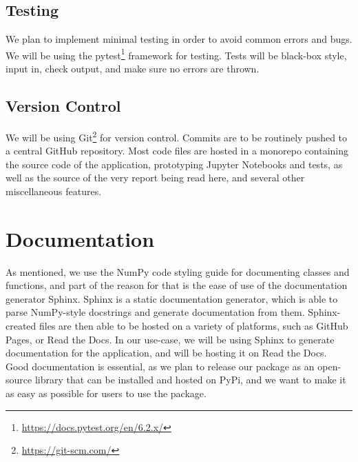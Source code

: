 \subsection{Testing}
We plan to implement minimal testing in order to avoid common errors and bugs. We will be using the pytest\footnote{\url{https://docs.pytest.org/en/6.2.x/}} framework for testing. Tests will be black-box style, input in, check output, and make sure no errors are thrown. 

\subsection{Version Control}

We will be using Git\footnote{\url{https://git-scm.com/}} for version control. Commits are to be routinely pushed to a central GitHub repository. Most code files are hosted in a monorepo containing the source code of the application, prototyping Jupyter Notebooks and tests, as well as the source of the very report being read here, and several other miscellaneous features. 


\section{Documentation}
As mentioned, we use the NumPy code styling guide for documenting classes and functions, and part of the reason for that is the ease of use of the documentation generator Sphinx. Sphinx is a static documentation generator, which is able to parse NumPy-style docstrings and generate documentation from them. Sphinx-created files are then able to be hosted on a variety of platforms, such as GitHub Pages, or Read the Docs. In our use-case, we will be using Sphinx to generate documentation for the application, and will be hosting it on Read the Docs. Good documentation is essential, as we plan to release our package as an open-source library that can be installed and hosted on PyPi, and we want to make it as easy as possible for users to use the package.
